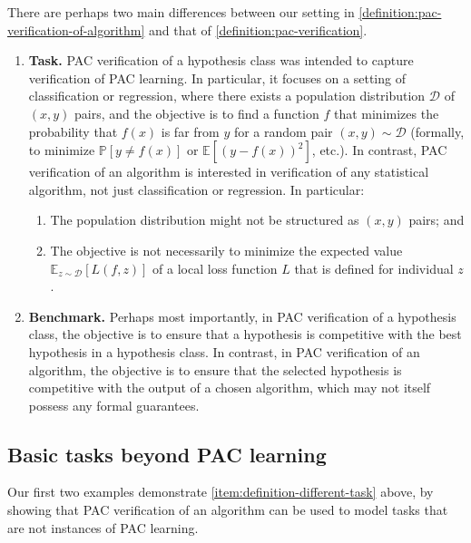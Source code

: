 \documentclass[11pt]{article}
\numberwithin{equation}{section}
\theoremstyle{definition}
\theoremstyle{plain}
\theoremstyle{definition}\newtheorem{notation}[theorem]{Notation}\theoremstyle{plain}\raggedbottom
\newcommand{\squareBrackets}[1]{
	\mathopen{}\left[#1\right]\mathclose{}
}
\newcommand{\customFunctionSquare}[2]{
	#1\squareBrackets{#2}
}
\newcommand{\bbFunction}[2]{
	\customFunctionSquare{\mathbb{#1}}{#2}
}
\newcommand{\PP}[1]{\bbFunction{P}{#1}}
\newcommand{\EE}[1]{\bbFunction{E}{#1}}
\newcommand{\EEE}[2]{\customFunctionSquare{\mathbb{E}_{#1}}{#2}}
\newcommand{\cD}{\mathcal{D}}
\newcommand{\1}{\mathds{1}}
\begin{document}
There are perhaps two main differences between our setting in \cref{definition:pac-verification-of-algorithm} and that of \cref{definition:pac-verification}. 
\begin{enumerate}
	\item{
		\label{item:definition-different-task}
		\textbf{Task.} PAC verification of a hypothesis class was intended to capture verification of PAC learning. In particular, it focuses on a setting of classification or regression, where there exists a population distribution $\cD$ of $(x,y)$ pairs, and the objective is to find a function $f$ that minimizes the probability that $f(x)$ is far from $y$ for a random pair $(x,y) \sim \cD$ (formally, to minimize $\PP{y \neq f(x)}$ or $\EE{(y-f(x))^2}$, etc.). 
		In contrast, PAC verification of an algorithm is interested in verification of any statistical algorithm, not just classification or regression. In particular:
		\begin{enumerate}
			\item{
				\label{item:population-not-x-y}
				The population distribution might not be structured as $(x,y)$ pairs; and
			}
			\item{
				\label{item:objective-not-local-expectation}
				The objective is not necessarily to minimize the expected value $\EEE{z \sim \cD}{L(f, z)}$ of a local loss function $L$ that is defined for individual $z$.
			}
		\end{enumerate}
	}
	\item{
		\label{item:definition-different-benchmark}
		\textbf{Benchmark.} Perhaps most importantly, in PAC verification of a hypothesis class, the objective is to ensure that a hypothesis is competitive with the best hypothesis in a hypothesis class. In contrast, in PAC verification of an algorithm, the objective is to ensure that the selected hypothesis is competitive with the output of a chosen algorithm, which may not itself possess any formal guarantees.
	}
\end{enumerate}


\subsection{Basic tasks beyond PAC learning}


Our first two examples demonstrate \cref{item:definition-different-task} above, by showing that PAC verification of an algorithm can be used to model tasks that are not instances of PAC learning.
\end{document}

